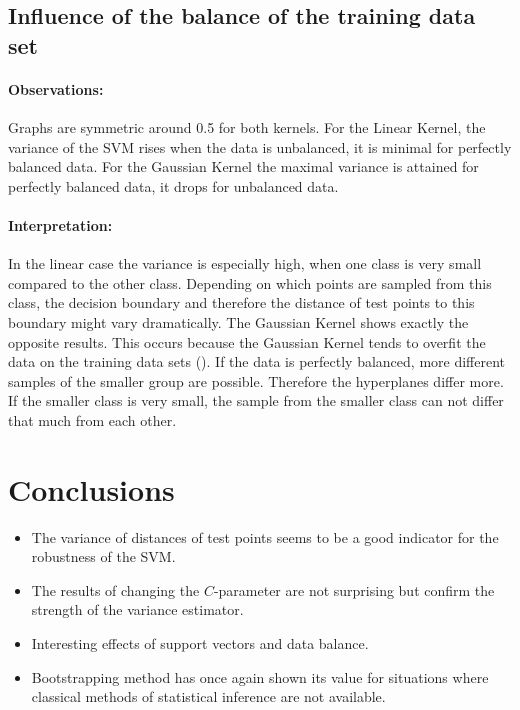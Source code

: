 \documentclass[a1,portrait]{a0poster}
\begin{document}
\begin{multicols}{3}
\begin{center}
\label{fig5}
\end{center}\vspace{1cm}



\subsection*{Influence of the balance of the training data set}

\paragraph{Observations:}
Graphs are symmetric around 0.5 for both kernels. For the Linear Kernel, the variance of the SVM rises when the data is unbalanced, it is minimal for perfectly balanced data. For the Gaussian Kernel the maximal variance is attained for perfectly balanced data, it drops for unbalanced data. 
\paragraph{Interpretation:}
In the linear case the variance is especially high, when one class is very small compared to the other class. Depending on which points are sampled from this class, the decision boundary and therefore the distance of test points to this boundary might vary dramatically.
The Gaussian Kernel shows exactly the opposite results. This occurs because the Gaussian Kernel tends to overfit the data on the training data sets (\cite{hastie_elements_2005}). If the data is perfectly balanced, more different samples of the smaller group are possible. Therefore the hyperplanes differ more. If the smaller class is very small, the sample from the smaller class can not differ that much from each other.




\color{hu_red} %

\section*{Conclusions}

\begin{itemize}
\item The variance of distances of test points seems to be a good indicator for the robustness of the SVM.
\item The results of changing the $C$-parameter are not surprising but confirm the strength of the variance estimator.
\item Interesting effects of support vectors and data balance.
\item Bootstrapping method has once again shown its value for situations where classical methods of statistical inference are not available.
\end{itemize}


\end{multicols}
\end{document}
